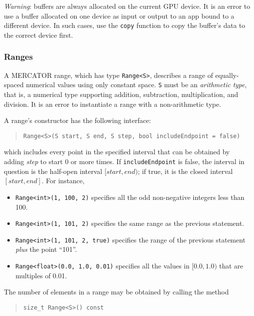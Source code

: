 \documentclass[11pt]{article}
\begin{document}
\textit{Warning}: buffers are always allocated on the current GPU device.
It is an error to use a buffer allocated on one device as input or output
to an app bound to a different device.  In such cases, use the \texttt{copy}
function to copy the buffer's data to the correct device first.

\subsubsection{Ranges}

A MERCATOR range, which has type \texttt{Range<S>}, describes a range
of equally-spaced numerical values using only constant space.
\texttt{S} must be an \textit{arithmetic type}, that is, a numerical
type supporting addition, subtraction, multiplication, and division.
It is an error to instantiate a range with a non-arithmetic type.

A range's constructor has the following interface:
\begin{quote}
\texttt{Range<S>(S start, S end, S step, bool includeEndpoint = false)}
\end{quote}
which includes every point in the specified interval that can be 
obtained by adding \textit{step} to start 0 or more times.
If \texttt{includeEndpoint} is false, the interval in question is
the half-open interval $[\textit{start}, \textit{end})$; if true,
it is the closed interval $[\textit{start}, \textit{end}]$.
For instance,
\begin{itemize}
\item \texttt{Range<int>(1, 100, 2)} specifies all the odd non-negative
      integers less than 100.

\item \texttt{Range<int>(1, 101, 2)} specifies the same range as
      the previous statement.

\item \texttt{Range<int>(1, 101, 2, true)} specifies the range of
      the previous statement \emph{plus} the point ``101''.

\item \texttt{Range<float>(0.0, 1.0, 0.01)} specifies all the values
      in $[0.0, 1.0)$ that are multiples of 0.01.
\end{itemize}

The number of elements in a range may be obtained by calling the
method
\begin{quote}
\texttt{size_t Range<S>() const}
\end{quote}
 
\end{document}
